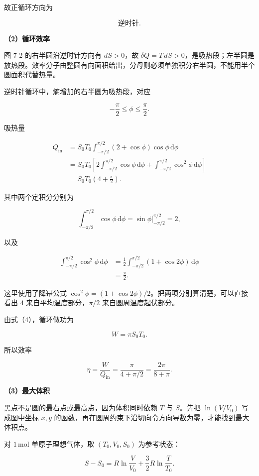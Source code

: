 \documentclass[12pt,a4paper,UTF8]{ctexart}
\begin{document}
故正循环方向为

\[\boxed{\text{逆时针}}. \tag{5}\]

\textbf{（2）循环效率}

图 7-2 的右半圆沿逆时针方向有 \(dS>0\)，故
\(\delta Q=T\,dS>0\)，是吸热段；左半圆是放热段。效率分子由整圆有向面积给出，分母则必须单独积分右半圆，不能用半个圆面积代替热量。

逆时针循环中，熵增加的右半圆为吸热段，对应

\[-\frac\pi2\leq\phi\leq\frac\pi2.\]

吸热量

\[\begin{aligned}
Q_{\mathrm{in}}
&=S_0T_0\int_{-\pi/2}^{\pi/2}
(2+\cos\phi)\cos\phi\,\mathrm d\phi\\
&=S_0T_0\left[
2\int_{-\pi/2}^{\pi/2}\cos\phi\,\mathrm d\phi
+\int_{-\pi/2}^{\pi/2}\cos^2\phi\,\mathrm d\phi
\right]\\
&=S_0T_0\left(4+\frac\pi2\right). 
\end{aligned} \tag{6}\]

其中两个定积分分别为

\[\int_{-\pi/2}^{\pi/2}\cos\phi\,\mathrm d\phi
=\left.\sin\phi\right|_{-\pi/2}^{\pi/2}=2,\]

以及

\[\begin{aligned}
\int_{-\pi/2}^{\pi/2}\cos^2\phi\,\mathrm d\phi
&=\frac12\int_{-\pi/2}^{\pi/2}(1+\cos2\phi)\,\mathrm d\phi\\
&=\frac\pi2.
\end{aligned}\]

这里使用了降幂公式
\(\cos^2\phi=(1+\cos2\phi)/2\)。把两项分别算清楚，可以直接看出 \(4\)
来自平均温度部分，\(\pi/2\) 来自圆周温度起伏部分。

由式（4），循环做功为

\[W=\pi S_0T_0. \tag{7}\]

所以效率

\[\boxed{
\eta=\frac{W}{Q_{\mathrm{in}}}
=\frac{\pi}{4+\pi/2}
=\frac{2\pi}{8+\pi}
}. \tag{8}\]

\textbf{（3）最大体积}

黑点不是圆的最右点或最高点，因为体积同时依赖 \(T\) 与 \(S\)。先把
\(\ln(V/V_0)\) 写成图中坐标 \(x,y\)
的函数，再在圆周约束下沿切向令方向导数为零，才能找到最大体积点。

对 \(1\,\mathrm{mol}\) 单原子理想气体，取 \((T_0,V_0,S_0)\) 为参考状态：

\[S-S_0=R\ln\frac{V}{V_0}+\frac32R\ln\frac{T}{T_0}. \tag{9}\]
\end{document}
